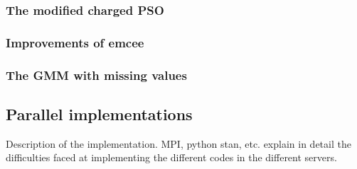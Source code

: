 \subsubsection{The modified charged PSO}
\subsubsection{Improvements of emcee}
\subsubsection{The GMM with missing values}
\subsection{Parallel implementations}
Description of the implementation. MPI, python stan, etc.
explain in detail the difficulties faced at implementing the different codes in the different servers.

